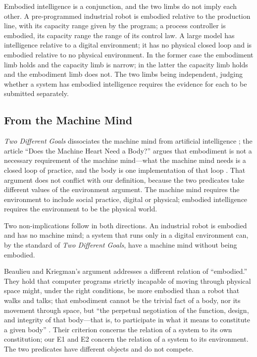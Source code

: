 \documentclass[10pt]{article}
\begin{document}
Embodied intelligence is a conjunction, and the two limbs do not imply each other. A pre-programmed industrial robot is embodied relative to the production line, with its capacity range given by the program; a process controller is embodied, its capacity range the range of its control law. A large model has intelligence relative to a digital environment; it has no physical closed loop and is embodied relative to no physical environment. In the former case the embodiment limb holds and the capacity limb is narrow; in the latter the capacity limb holds and the embodiment limb does not. The two limbs being independent, judging whether a system has embodied intelligence requires the evidence for each to be submitted separately.

\subsection{From the Machine Mind}\label{sec:machinemind}

\textit{Two Different Goals} dissociates the machine mind from artificial intelligence \cite{yu2026two}; the article ``Does the Machine Heart Need a Body?'' argues that embodiment is not a necessary requirement of the machine mind---what the machine mind needs is a closed loop of practice, and the body is one implementation of that loop \cite{yu2026blog}. That argument does not conflict with our definition, because the two predicates take different values of the environment argument. The machine mind requires the environment to include social practice, digital or physical; embodied intelligence requires the environment to be the physical world.

Two non-implications follow in both directions. An industrial robot is embodied and has no machine mind; a system that runs only in a digital environment can, by the standard of \textit{Two Different Goals}, have a machine mind without being embodied.

Beaulieu and Kriegman's argument addresses a different relation of ``embodied.'' They hold that computer programs strictly incapable of moving through physical space might, under the right conditions, be more embodied than a robot that walks and talks; that embodiment cannot be the trivial fact of a body, nor its movement through space, but ``the perpetual negotiation of the function, design, and integrity of that body---that is, to participate in what it means to constitute a given body'' \cite{beaulieu2023}. Their criterion concerns the relation of a system to its own constitution; our E1 and E2 concern the relation of a system to its environment. The two predicates have different objects and do not compete.
\end{document}
